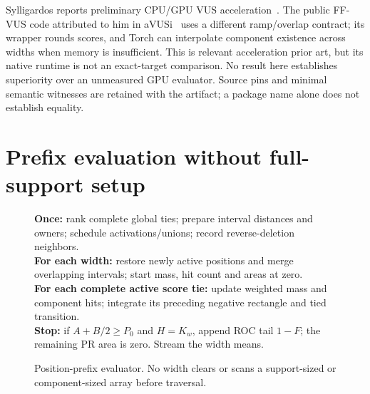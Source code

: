 Sylligardos reports preliminary CPU/GPU VUS acceleration~\cite{sylligardos2025}.
The public FF-VUS code attributed to him in aVUSi~\cite{ffvus2026} uses a
different ramp/overlap contract; its wrapper rounds scores, and Torch can
interpolate component existence across widths when memory is insufficient.
This is relevant acceleration prior art, but its native runtime is not an
exact-target comparison. No result here establishes superiority over an
unmeasured GPU evaluator. Source pins and minimal semantic witnesses are
retained with the artifact; a package name alone does not establish equality.

\section{Prefix evaluation without full-support setup}
\begin{figure}[t]
\begin{minipage}{\linewidth}
\textbf{Once:} rank complete global ties; prepare interval distances and
owners; schedule activations/unions; record reverse-deletion neighbors.\\[2pt]
\textbf{For each width:} restore newly active positions and merge overlapping
intervals; start mass, hit count and areas at zero.\\[2pt]
\textbf{For each complete active score tie:} update weighted mass and component
hits; integrate its preceding negative rectangle and tied transition.\\[2pt]
\textbf{Stop:} if $A+B/2\ge P_0$ and $H=K_w$, append ROC tail $1-F$;
the remaining PR area is zero. Stream the width means.
\end{minipage}
\caption{Position-prefix evaluator. No width clears or scans a support-sized
or component-sized array before traversal.}
\label{fig:sparse-prefix}
\end{figure}


